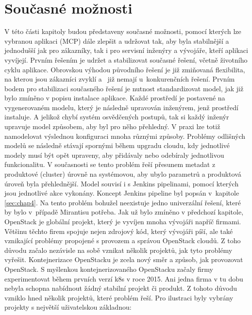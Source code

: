 \section{Současné možnosti}
V této části kapitoly budou představeny současné možnosti, pomocí kterých lze vybranou aplikaci (MCP) dále zlepšit a udržovat tak, aby byla stabilnější a jednodušší jak pro zákazníky, tak i pro servisní inženýry a vývojáře, kteří aplikaci vyvíjejí.
Prvním řešením je udržet a stabilizovat současné řešení, včetně životního cyklu aplikace. Obrovskou výhodou původního řešení je již zmiňovaná flexibilita, na kterou jsou zákazníci zvyklí a  již nemají u konkurenčních řešení. Prvním bodem pro stabilizaci současného řešení je nutnost standardizovat model, jak již bylo zmíněno v popisu instalace aplikace. Každé prostředí je postavené na vygenerovaném modelu, který je následně upravován inženýrem, jenž prostředí instaluje. A jelikož chybí systém osvědčených postupů, tak si každý inženýr upravuje model způsobem, aby byl pro něho přehledný. V praxi lze totiž namodelovat výslednou konfiguraci mnoha různými způsoby. Problémy odlišných modelů se následně stávají spornými během upgradu cloudu, kdy jednotlivé modely musí být opět upraveny, aby přidávaly nebo odebíraly jednotlivou funkcionalitu. V současnosti se tento problém řeší přesunem metadat z produktové (cluster) úrovně na systémovou, aby ubylo parametrů a produktová úroveň byla přehlednější. Model souvisí i s Jenkins pipelinami, pomocí kterých jsou jednotlivé akce vykonány. Koncept Jenkins pipeline byl popsán v kapitole \ref{sec:chap4}. Na tento problém bohužel neexistuje jedno univerzální řešení, které by bylo v případě Mirantisu potřeba.
Jak už bylo zmíněno v předchozí kapitole, OpenStack je globální projekt, který je vyvíjen mnoha vývojáři napříč firmami. Většinu těchto firem spojuje nejen zdrojový kód, který vývojáři píší, ale také vznikající problémy propojené s provozem a správou OpenStack cloudů. Z toho důvodu začalo nezávisle na sobě vznikat několik projektů, jak tyto problémy vyřešit. Kontejnerizace OpenStacku je zcela nový směr a způsob, jak provozovat OpenStack. S myšlenkou kontejnerizovaného OpenStacku začaly firmy experimentovat během prvních verzí k8s v roce 2015. Ani jedna firma v tu dobu nebyla schopna nabídnout žádný stabilní projekt či produkt. Z tohoto důvodu vzniklo hned několik projektů, které problém řeší. Pro ilustraci byly vybrány projekty s největší uživatelskou základnou:
